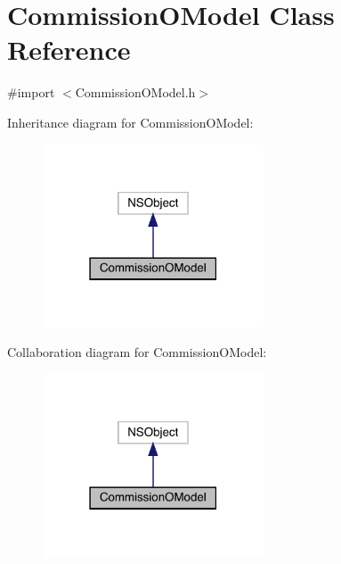 \hypertarget{interface_commission_o_model}{}\section{Commission\+O\+Model Class Reference}
\label{interface_commission_o_model}


{\ttfamily \#import $<$Commission\+O\+Model.\+h$>$}



Inheritance diagram for Commission\+O\+Model\+:\nopagebreak
\begin{figure}[H]
\begin{center}
\leavevmode
\includegraphics[width=186pt]{interface_commission_o_model__inherit__graph}
\end{center}
\end{figure}


Collaboration diagram for Commission\+O\+Model\+:\nopagebreak
\begin{figure}[H]
\begin{center}
\leavevmode
\includegraphics[width=186pt]{interface_commission_o_model__coll__graph}
\end{center}
\end{figure}
